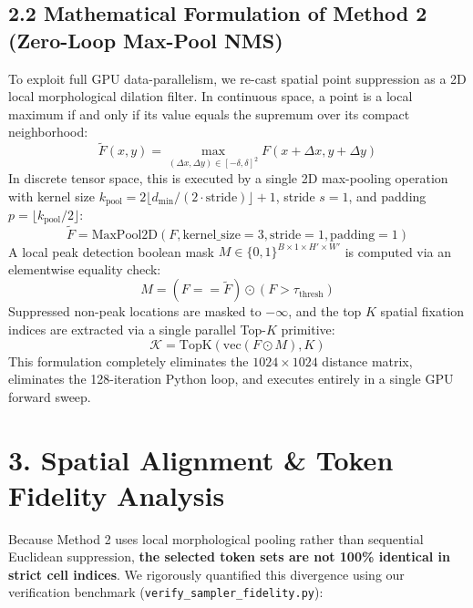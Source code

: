 \documentclass[11pt,a4paper]{article}
\begin{document}
\subsection*{2.2 Mathematical Formulation of Method 2 (Zero-Loop Max-Pool NMS)}
To exploit full GPU data-parallelism, we re-cast spatial point suppression as a 2D local morphological dilation filter. In continuous space, a point is a local maximum if and only if its value equals the supremum over its compact neighborhood:
\begin{equation}
    \tilde{F}(x, y) = \max_{(\Delta x, \Delta y) \in [-\delta, \delta]^2} F(x + \Delta x, y + \Delta y)
\end{equation}
In discrete tensor space, this is executed by a single 2D max-pooling operation with kernel size $k_{\text{pool}} = 2\lfloor d_{\min} / (2 \cdot \text{stride}) \rfloor + 1$, stride $s=1$, and padding $p = \lfloor k_{\text{pool}} / 2 \rfloor$:
\begin{equation}
    \tilde{F} = \text{MaxPool2D}(F, \text{kernel\_size}=3, \text{stride}=1, \text{padding}=1)
\end{equation}
A local peak detection boolean mask $M \in \{0, 1\}^{B \times 1 \times H' \times W'}$ is computed via an elementwise equality check:
\begin{equation}
    M = \left( F == \tilde{F} \right) \odot \left( F > \tau_{\text{thresh}} \right)
\end{equation}
Suppressed non-peak locations are masked to $-\infty$, and the top $K$ spatial fixation indices are extracted via a single parallel Top-$K$ primitive:
\begin{equation}
    \mathcal{K} = \text{TopK}\left( \text{vec}(F \odot M), K \right)
\end{equation}
This formulation completely eliminates the $1024\times 1024$ distance matrix, eliminates the 128-iteration Python loop, and executes entirely in a single GPU forward sweep.

\vspace{0.4em}

\section*{3. Spatial Alignment \& Token Fidelity Analysis}

Because Method 2 uses local morphological pooling rather than sequential Euclidean suppression, \textbf{the selected token sets are not 100\% identical in strict cell indices}. We rigorously quantified this divergence using our verification benchmark (\texttt{verify\_sampler\_fidelity.py}):
\end{document}

